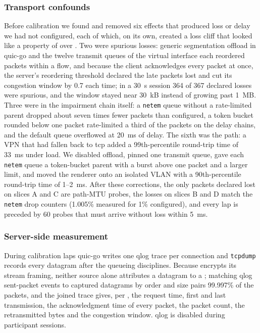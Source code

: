 \subsubsection{Transport confounds}
\label{sec:sys-confounds}
Before calibration we found and removed six effects that produced loss
or delay we had not configured, each of which, on its own, created a
loss cliff that looked like a property of \vpcc over \quic. Two were
spurious losses: generic segmentation offload in quic-go and the
twelve transmit queues of the virtual interface each reordered packets
within a flow, and because the client acknowledges every packet at
once, the server's reordering threshold declared the late packets lost
and cut its congestion window by 0.7 each time; in a \SI{30}{\second}
session 364 of 367 declared losses were spurious, and the window
stayed near \SI{30}{kB} instead of growing past \SI{1}{MB}. Three were
in the impairment chain itself: a \texttt{netem} queue without a
rate-limited parent dropped about seven times fewer packets than
configured, a token bucket rounded below one packet rate-limited a
third of the packets on the delay chains, and the default queue
overflowed at \SI{20}{\milli\second} of delay. The sixth was the path:
a VPN that had fallen back to \gls{tcp} added a 99th-percentile
round-trip time of \SI{33}{\milli\second} under load. We disabled
offload, pinned one transmit queue, gave each \texttt{netem} queue a
token-bucket parent with a burst above one packet and a larger limit,
and moved the renderer onto an isolated VLAN with a 90th-percentile
round-trip time of 1--\SI{2}{\milli\second}. After these corrections,
the only packets declared lost on slices A and C are path-MTU probes,
the losses on slices B and D match the \texttt{netem} drop counters
(1.005\% measured for 1\% configured), and every lap is preceded by 60
probes that must arrive without loss within \SI{5}{\milli\second}.

\subsubsection{Server-side measurement}
During calibration laps quic-go writes one qlog trace per connection
and \texttt{tcpdump} records every datagram after the queueing
disciplines. Because \quic encrypts its stream framing, neither source
alone attributes a datagram to a \gof; matching qlog sent-packet events
to captured datagrams by order and size pairs 99.997\% of the packets,
and the joined trace gives, per \gof, the request time, first and last
transmission, the acknowledgment time of every packet, the packet
count, the retransmitted bytes and the congestion window. qlog is
disabled during participant sessions.

